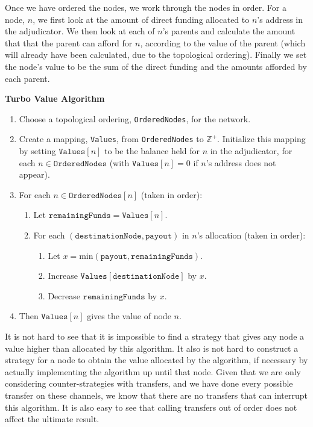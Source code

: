 Once we have ordered the nodes, we work through the nodes in order.
For a node, $n$, we first look at the amount of direct funding allocated to $n$'s address in the adjudicator.
We then look at each of $n$'s parents and calculate the amount that that the parent can afford for $n$, according to the value of the parent (which will already have been calculated, due to the topological ordering).
Finally we set the node's value to be the sum of the direct funding and the amounts afforded by each parent.

\textbf{Turbo Value Algorithm}
\begin{enumerate}
  \item Choose a topological ordering, \texttt{OrderedNodes}, for the network.
  \item Create a mapping, \texttt{Values}, from \texttt{OrderedNodes} to $\mathbb{Z}^+$. Initialize this mapping by setting $\texttt{Values}[n]$ to be the balance held for $n$ in the adjudicator, for each $n \in \texttt{OrderedNodes}$ (with $\texttt{Values}[n] = 0$ if $n$'s address does not appear).
  \item For each $n \in \texttt{OrderedNodes}[n]$ (taken in order):
  \begin{enumerate}
    \item Let $\texttt{remainingFunds} = \texttt{Values}[n]$.
    \item For each $(\texttt{destinationNode}, \texttt{payout})$ in $n$'s allocation (taken in order):
      \begin{enumerate}
        \item Let $x = \text{min}(\texttt{payout}, \texttt{remainingFunds})$.
        \item Increase $\texttt{Values}[\texttt{destinationNode}]$ by $x$.
        \item Decrease $\texttt{remainingFunds}$ by $x$.
      \end{enumerate}
  \end{enumerate}
  \item Then $\texttt{Values}[n]$ gives the value of node $n$.
\end{enumerate}

It is not hard to see that it is impossible to find a strategy that gives any node a value higher than allocated by this algorithm.
It also is not hard to construct a strategy for a node to obtain the value allocated by the algorithm, if necessary by actually implementing the algorithm up until that node.
Given that we are only considering counter-strategies with transfers, and we have done every possible transfer on these channels, we know that there are no transfers that can interrupt this algorithm.
It is also easy to see that calling transfers out of order does not affect the ultimate result.

